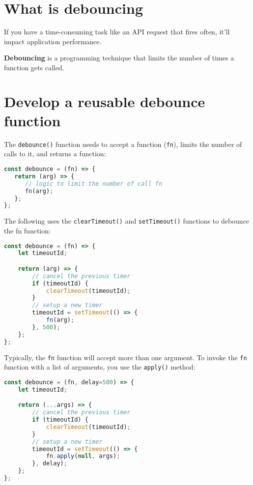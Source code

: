 \documentclass[11pt]{article}
\begin{document}
\section*{What is debouncing}

If you have a time-consuming task like an API request that fires often,
it'll impact application performance.
\newline

\noindent
\textbf{Debouncing} is a programming technique that limits the number of
times a function gets called.

\section*{Develop a reusable debounce function}

The \verb|debounce()| function needs to accept a function (\verb|fn|), limits the
number of calls to it, and returns a function:

\begin{lstlisting}[language=JavaScript]
const debounce = (fn) => {
   return (arg) => {
      // logic to limit the number of call fn
      fn(arg);
   };
};
\end{lstlisting}

\noindent
The following uses the \verb|clearTimeout()| and \verb|setTimeout()| functions
to debounce the fn function:

\begin{lstlisting}[language=JavaScript]
const debounce = (fn) => {
    let timeoutId;

    return (arg) => {
        // cancel the previous timer
        if (timeoutId) {
            clearTimeout(timeoutId);
        }
        // setup a new timer
        timeoutId = setTimeout(() => {
            fn(arg);
        }, 500);
    };
};
\end{lstlisting}

\noindent
Typically, the \verb|fn| function will accept more than one argument.
To invoke the \verb|fn| function with a list of arguments,
you use the \verb|apply()| method:
\newpage
\begin{lstlisting}[language=JavaScript]
const debounce = (fn, delay=500) => {
    let timeoutId;

    return (...args) => {
        // cancel the previous timer
        if (timeoutId) {
            clearTimeout(timeoutId);
        }
        // setup a new timer
        timeoutId = setTimeout(() => {
            fn.apply(null, args);
        }, delay);
    };
};
\end{lstlisting}
\end{document}
